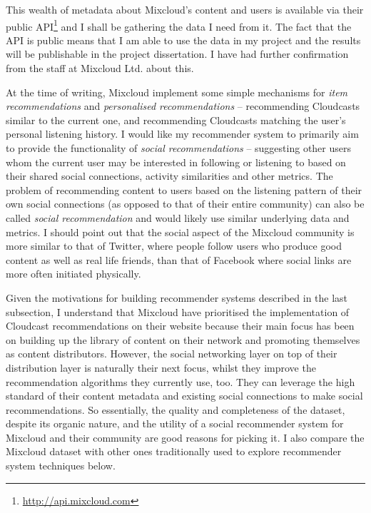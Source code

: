 This wealth of metadata about Mixcloud's content and users is available via 
their public API\footnote{\url{http://api.mixcloud.com}} and I shall be 
gathering the data I need from it. The fact that the API is public means that I 
am able to use the data in my project and the results will be publishable in 
the project dissertation. I have had further confirmation from the staff at 
Mixcloud Ltd. about this.

At the time of writing, Mixcloud implement some simple mechanisms for 
\emph{item recommendations} and \emph{personalised recommendations} -- 
recommending Cloudcasts similar to the current one, and recommending Cloudcasts 
matching the user's personal listening history. I would like my recommender 
system to primarily aim to provide the functionality of 
\emph{social recommendations} -- suggesting other users whom the current user 
may be interested in following or listening to based on their shared social 
connections, activity similarities and other metrics. The problem of 
recommending content to users based on the listening pattern of their own 
social connections (as opposed to that of their entire community) can also be 
called \emph{social recommendation} and would likely use similar underlying 
data and metrics. I should point out that the social aspect of the Mixcloud 
community is more similar to that of Twitter, where people follow users who 
produce good content as well as real life friends, than that of Facebook where 
social links are more often initiated physically.

Given the motivations for building recommender systems described in the last 
subsection, I understand that Mixcloud have prioritised the implementation of 
Cloudcast recommendations on their website because their main focus has been on 
building up the library of content on their network and promoting themselves as 
content distributors. However, the social networking layer on top of their 
distribution layer is naturally their next focus, whilst they improve the 
recommendation algorithms they currently use, too. They can leverage the high 
standard of their content metadata and existing social connections to make 
social recommendations. So essentially, the quality and completeness of the 
dataset, despite its organic nature, and the utility of a social recommender 
system for Mixcloud and their community are good reasons for picking it. I also 
compare the Mixcloud dataset with other ones traditionally used to explore 
recommender system techniques below.

